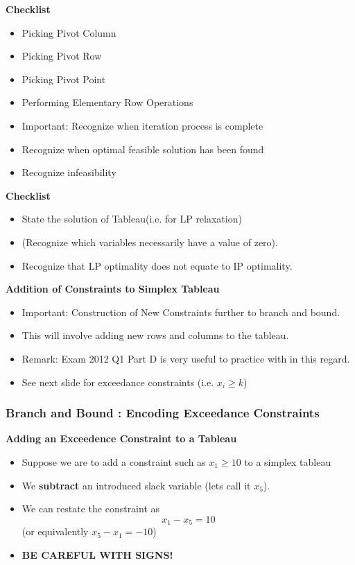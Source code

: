 \documentclass{beamer}
\begin{document}
\begin{frame}
	\noindent \textbf{Checklist}
	
	\begin{itemize}
		\item Picking Pivot Column
		\item Picking Pivot Row
		\item Picking Pivot Point
		\item Performing Elementary Row Operations
		\item Important: Recognize when iteration process is complete
		\item Recognize when optimal feasible solution has been found
		\item Recognize infeasibility 
	\end{itemize}
	
\end{frame}
\begin{frame}
	\noindent \textbf{Checklist}
	
	\begin{itemize}
		\item State the solution of Tableau(i.e. for LP relaxation)
		\item (Recognize which variables necessarily have a value of zero).
		\item Recognize that LP optimality does not equate to IP optimality.
	\end{itemize}
\end{frame}
\begin{frame}
	\noindent \textbf{Addition of Constraints to Simplex Tableau}
	
	\begin{itemize}
\item Important: Construction of New Constraints further to branch and bound.
\item This will involve adding new rows and columns to the tableau.
\item Remark: Exam 2012 Q1 Part D is very useful to practice with in this regard.
\item See next slide for exceedance constraints (i.e. $x_i \geq  k$)
\end{itemize}

\end{frame}
	\begin{frame}
		\frametitle{Branch and Bound : Encoding Exceedance Constraints}
		\large
	\noindent \textbf{Adding an Exceedence Constraint to a Tableau}
		\begin{itemize}
			\item Suppose we are to add a constraint such as $x_1 \geq 10$ to a simplex tableau
			\item We \textbf{subtract} an introduced slack variable (lets call it $x_5$).
			\item We can restate the constraint as \[x_1 -x_5 = 10\] (or equivalently $x_5-x_1=-10$)
			\item \textbf{\alert{BE CAREFUL WITH SIGNS!}}
		\end{itemize}
\end{frame}
\end{document}
